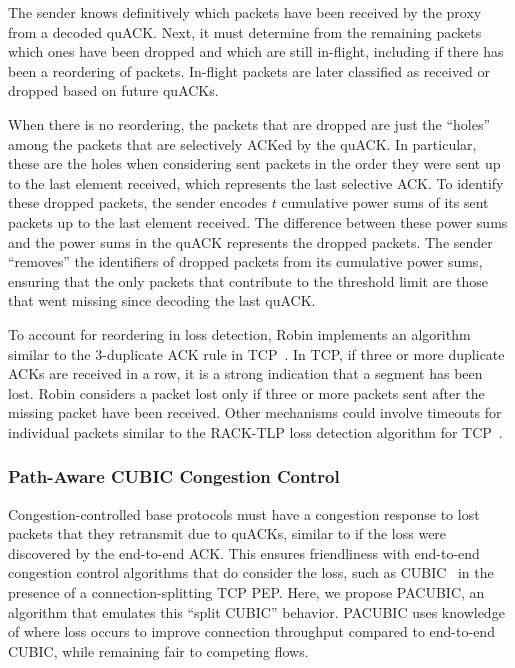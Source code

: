 The sender knows definitively which packets have been received by the proxy from
a decoded quACK. Next, it must determine from the remaining packets which ones
have been dropped and which are still in-flight, including if there has been a
reordering of packets. In-flight packets are later
classified as received or dropped based on future quACKs.

When there is no reordering, the packets that are dropped are just the ``holes''
among the packets that are selectively ACKed by the quACK. In particular, these
are the holes when considering sent packets in the order they were sent up to
the last element received, which represents the last selective ACK.
To identify these dropped packets, the sender encodes $t$ cumulative power sums
of its sent packets up to the last element received.
The difference between these power sums and the power
sums in the quACK represents the dropped packets. The sender ``removes'' the
identifiers of dropped packets from its cumulative power sums, ensuring that
the only packets that contribute to the threshold limit are those that
went missing since decoding the last quACK.

To account for reordering in loss detection, Robin implements an algorithm
similar to the 3-duplicate ACK rule in TCP~\cite{rfc5681tcp,rfc2001tcp}.
In TCP, if three or more duplicate ACKs are received in a row, it is a strong
indication that a segment has been lost. Robin considers a packet lost only if
three or more packets sent after the missing packet have been received.
Other mechanisms could involve timeouts for individual packets similar to the
RACK-TLP loss detection algorithm for TCP~\cite{rfc8985}.

\subsubsection{Path-Aware CUBIC Congestion Control}

Congestion-controlled base protocols must have a congestion response to lost
packets that they retransmit due to quACKs, similar to if the loss were
discovered by the end-to-end ACK.
This ensures friendliness with end-to-end congestion control algorithms that do
consider the loss, such as CUBIC~\cite{ha2008cubic} in the presence of a
connection-splitting TCP PEP.
Here, we propose PACUBIC, an algorithm that emulates this ``split CUBIC''
behavior. PACUBIC uses knowledge of where loss occurs to improve connection
throughput compared to end-to-end CUBIC, while remaining fair to competing flows.

